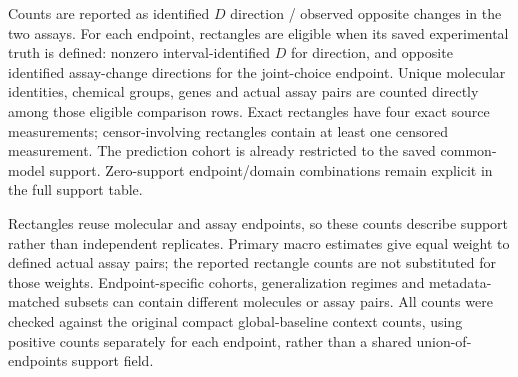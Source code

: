 Counts are reported as identified $D$ direction / observed opposite changes in
the two assays. For each endpoint, rectangles are eligible when its saved
experimental truth is defined: nonzero interval-identified $D$ for direction,
and opposite identified assay-change directions for the joint-choice endpoint.
Unique molecular identities, chemical groups, genes and actual assay pairs are
counted directly among those eligible comparison rows. Exact rectangles have
four exact source measurements; censor-involving rectangles contain at least
one censored measurement. The prediction cohort is already restricted to the
saved common-model support. Zero-support endpoint/domain combinations remain
explicit in the full support table.

Rectangles reuse molecular and assay endpoints, so these counts describe
support rather than independent replicates. Primary macro estimates give equal
weight to defined actual assay pairs; the reported rectangle counts are not
substituted for those weights. Endpoint-specific cohorts, generalization
regimes and metadata-matched subsets can contain different molecules or assay
pairs. All counts were checked against the original compact global-baseline
context counts, using positive counts separately for each endpoint, rather than
a shared union-of-endpoints support field.
